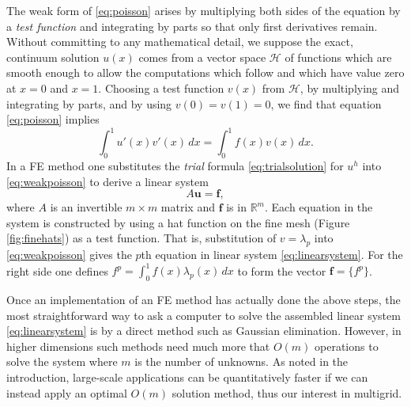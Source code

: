 \documentclass[letterpaper,final,12pt,reqno]{amsart}
\newcommand{\RR}{\mathbb{R}}
\newcommand{\bbf}{\mathbf{f}}
\newcommand{\bu}{\mathbf{u}}
\begin{document}
The weak form of \eqref{eq:poisson} arises by multiplying both sides of the equation by a \emph{test function} and integrating by parts so that only first derivatives remain.  Without committing to any mathematical detail, we suppose the exact, continuum solution $u(x)$ comes from a vector space $\mathcal{H}$ of functions which are smooth enough to allow the computations which follow and which have value zero at $x=0$ and $x=1$.  Choosing a test function $v(x)$ from $\mathcal{H}$, by multiplying and integrating by parts, and by using $v(0)=v(1)=0$, we find that equation \eqref{eq:poisson} implies
\begin{equation}
\int_0^1 u'(x) v'(x)\,dx = \int_0^1 f(x) v(x)\, dx.
\label{eq:weakpoisson}
\end{equation}
In a FE method one substitutes the \emph{trial} formula \eqref{eq:trialsolution} for $u^h$ into \eqref{eq:weakpoisson} to derive a linear system
\begin{equation}
A \bu = \bbf, \label{eq:linearsystem}
\end{equation}
where $A$ is an invertible $m\times m$ matrix and $\bbf$ is in $\RR^m$.  Each equation in the system is constructed by using a hat function on the fine mesh (Figure \ref{fig:finehats}) as a test function.  That is, substitution of $v=\lambda_p$ into \eqref{eq:weakpoisson} gives the $p$th equation in linear system \eqref{eq:linearsystem}.  For the right side one defines $f^p = \int_0^1 f(x) \lambda_p(x)\,dx$ to form the vector $\bbf = \{f^p\}$.

Once an implementation of an FE method has actually done the above steps, the most straightforward way to ask a computer to solve the assembled linear system \eqref{eq:linearsystem} is by a direct method such as Gaussian elimination.  However, in higher dimensions such methods need much more that $O(m)$ operations to solve the system where $m$ is the number of unknowns.  As noted in the introduction, large-scale applications can be quantitatively faster if we can instead apply an optimal $O(m)$ solution method, thus our interest in multigrid.
\end{document}
